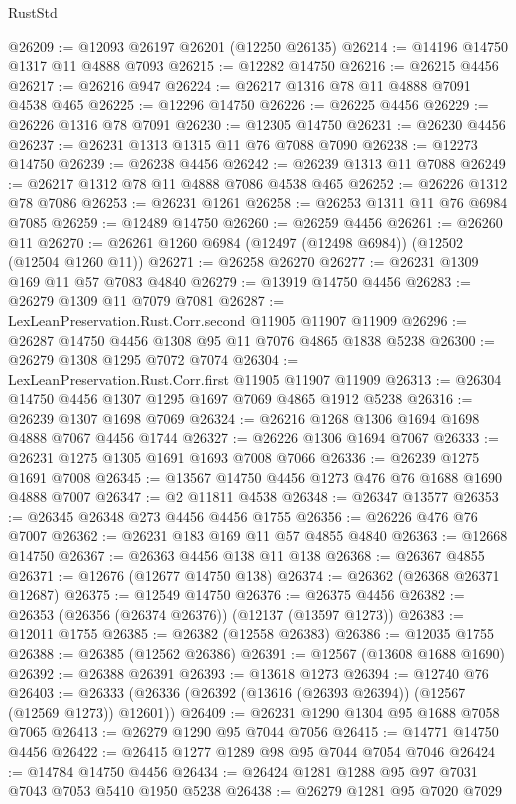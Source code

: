 \begin{lexlean}{RustStd}
\begin{coremodule}
@26209 := @12093 @26197 @26201 (@12250 @26135)
@26214 := @14196 @14750 @1317 @11 @4888 @7093
@26215 := @12282 @14750
@26216 := @26215 @4456
@26217 := @26216 @947
@26224 := @26217 @1316 @78 @11 @4888 @7091 @4538 @465
@26225 := @12296 @14750
@26226 := @26225 @4456
@26229 := @26226 @1316 @78 @7091
@26230 := @12305 @14750
@26231 := @26230 @4456
@26237 := @26231 @1313 @1315 @11 @76 @7088 @7090
@26238 := @12273 @14750
@26239 := @26238 @4456
@26242 := @26239 @1313 @11 @7088
@26249 := @26217 @1312 @78 @11 @4888 @7086 @4538 @465
@26252 := @26226 @1312 @78 @7086
@26253 := @26231 @1261
@26258 := @26253 @1311 @11 @76 @6984 @7085
@26259 := @12489 @14750
@26260 := @26259 @4456
@26261 := @26260 @11
@26270 := @26261 @1260 @6984 (@12497 (@12498 @6984)) (@12502 (@12504 @1260 @11))
@26271 := @26258 @26270
@26277 := @26231 @1309 @169 @11 @57 @7083 @4840
@26279 := @13919 @14750 @4456
@26283 := @26279 @1309 @11 @7079 @7081
@26287 := LexLeanPreservation.Rust.Corr.second @11905 @11907 @11909
@26296 := @26287 @14750 @4456 @1308 @95 @11 @7076 @4865 @1838 @5238
@26300 := @26279 @1308 @1295 @7072 @7074
@26304 := LexLeanPreservation.Rust.Corr.first @11905 @11907 @11909
@26313 := @26304 @14750 @4456 @1307 @1295 @1697 @7069 @4865 @1912 @5238
@26316 := @26239 @1307 @1698 @7069
@26324 := @26216 @1268 @1306 @1694 @1698 @4888 @7067 @4456 @1744
@26327 := @26226 @1306 @1694 @7067
@26333 := @26231 @1275 @1305 @1691 @1693 @7008 @7066
@26336 := @26239 @1275 @1691 @7008
@26345 := @13567 @14750 @4456 @1273 @476 @76 @1688 @1690 @4888 @7007
@26347 := @2 @11811 @4538
@26348 := @26347 @13577
@26353 := @26345 @26348 @273 @4456 @4456 @1755
@26356 := @26226 @476 @76 @7007
@26362 := @26231 @183 @169 @11 @57 @4855 @4840
@26363 := @12668 @14750
@26367 := @26363 @4456 @138 @11 @138
@26368 := @26367 @4855
@26371 := @12676 (@12677 @14750 @138)
@26374 := @26362 (@26368 @26371 @12687)
@26375 := @12549 @14750
@26376 := @26375 @4456
@26382 := @26353 (@26356 (@26374 @26376)) (@12137 (@13597 @1273))
@26383 := @12011 @1755
@26385 := @26382 (@12558 @26383)
@26386 := @12035 @1755
@26388 := @26385 (@12562 @26386)
@26391 := @12567 (@13608 @1688 @1690)
@26392 := @26388 @26391
@26393 := @13618 @1273
@26394 := @12740 @76
@26403 := @26333 (@26336 (@26392 (@13616 (@26393 @26394)) (@12567 (@12569 @1273)) @12601))
@26409 := @26231 @1290 @1304 @95 @1688 @7058 @7065
@26413 := @26279 @1290 @95 @7044 @7056
@26415 := @14771 @14750 @4456
@26422 := @26415 @1277 @1289 @98 @95 @7044 @7054 @7046
@26424 := @14784 @14750 @4456
@26434 := @26424 @1281 @1288 @95 @97 @7031 @7043 @7053 @5410 @1950 @5238
@26438 := @26279 @1281 @95 @7020 @7029

\end{coremodule}
\end{lexlean}
